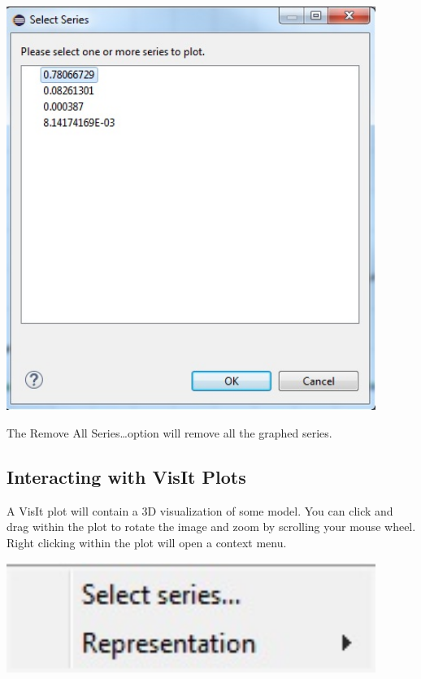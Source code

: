 \documentclass{article}
\begin{document}
\begin{center}
\includegraphics[width=12cm]{images/CSVSelectIndependentSeriesDatabase}
\end{center}

The Remove All Series\ldots option will remove all the graphed series.

\subsection{Interacting with VisIt Plots}

A VisIt plot will contain a 3D visualization of some model. You can click and
drag within the plot to rotate the image and zoom by scrolling your mouse wheel.
Right clicking within the plot will open a context menu. 

\begin{center}
\includegraphics[width=12cm]{images/VisItContextMenu}
\end{center}
\end{document}
